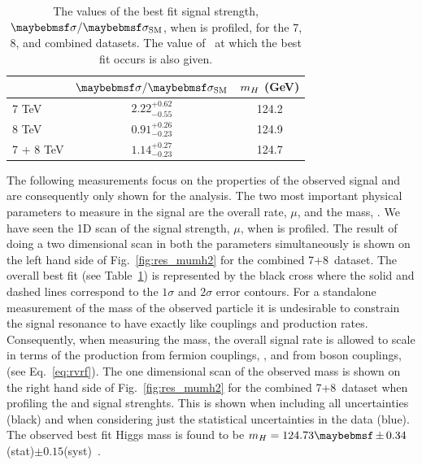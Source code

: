 \begin{table}
    \caption{\label{tab:res_mu} The values of the best fit signal
      strength, $\musm$, when \mH is profiled, for the 7\TeV, 8\TeV, and combined datasets. 
      The value of \mH\ at which the best fit occurs is also given.
      }
  \begin{center}
    \begin{tabular}{l|c|c}
      & $\musm$  & $m_{H}$ (GeV)       \\  \hline
      7 TeV  & $2.22^{+0.62}_{-0.55}$ & 124.2  \\ 
      8 TeV  & $0.91^{+0.26}_{-0.23}$ & 124.9  \\ \hline
      7 + 8 TeV & $1.14^{+0.27}_{-0.23}$ & 124.7  \\ 
    \end{tabular}
    \end{center}
\end{table}

The following measurements focus on the properties of the observed signal and are consequently only shown for the \MFM analysis. The two most important physical parameters to measure in the signal are the overall rate, $\mu$, and the mass, \mH. We have seen the 1D \NLL scan of the signal strength, $\mu$, when \mH is profiled. The result of doing a two dimensional \NLL scan in both the parameters simultaneously is shown on the left hand side of Fig.~\ref{fig:res_mumh2} for the combined 7+8~\TeV dataset. The overall best fit (see Table~\ref{tab:res_mu}) is represented by the black cross where the solid and dashed lines correspond to the $1\sigma$ and $2\sigma$ error contours. For a standalone measurement of the mass of the observed particle it is undesirable to constrain the signal resonance to have exactly \SM like couplings and production rates. Consequently, when measuring the mass, the overall signal rate is allowed to scale in terms of the production from fermion couplings, \RF, and from boson couplings, \RV (see Eq.~\ref{eq:rvrf}). The one dimensional \NLL scan of the observed mass is shown on the right hand side of Fig.~\ref{fig:res_mumh2} for the combined 7+8~\TeV dataset when profiling the \RV and \RF signal strenghts. This is shown when including all uncertainties (black) and when considering just the statistical uncertainties in the data (blue). The observed best fit Higgs mass is found to be $\mH=124.73\pm0.34$(stat)$\pm0.15$(syst)~\GeV. 

